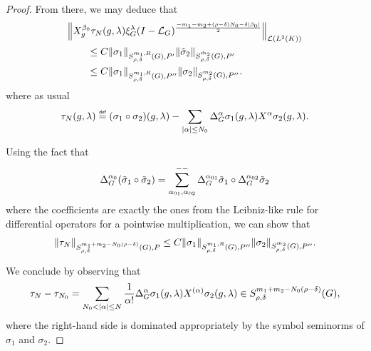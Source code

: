 \begin{proof}
    From there,
    we may deduce that
    \begin{align*}
        &\norm [\Lin {\Lebesgue 2 \CompactGroup}] {%
        \LeftDifferentialOperator [g] {\beta_0}
        \tau_N(g, \lambda)
        \Rep \lambda \BesselPotential {-m_1 - m_2 + (\rho - \delta) N_0 - \delta \abs {\beta_0}}
        }\\
        &\qquad \leq C \SymbolSemiNorm {m_1, R} {\rho, \delta} {P'} {\sigma_1} \SymbolSemiNorm {\tilde m_2} {\rho, \delta} {P'} {\tilde \sigma_2}\\
        &\qquad \leq C \SymbolSemiNorm {m_1, R} {\rho, \delta} {P''} {\sigma_1} \SymbolSemiNorm {m_2} {\rho, \delta} {P''} {\sigma_2}.
    \end{align*}
    where as usual
    \begin{align*}
        \tau_N(g, \lambda)
        \defeq
        (\sigma_1 \circ \sigma_2)(g, \lambda)
        - \sum_{\abs \alpha \leq N_0} \DifferenceOperatorOrder \alpha \sigma_1(g, \lambda) \LeftDifferentialOperator \alpha \sigma_2(g, \lambda).
    \end{align*}

    Using the fact that
    \begin{align*}
        \DifferenceOperatorOrder {\alpha_0} (\tilde \sigma_1 \circ \tilde \sigma_2)
        = \lcsum{\alpha_{01}, \alpha_{02}}
        \DifferenceOperatorOrder {\alpha_{01}} \tilde \sigma_1 \circ
        \DifferenceOperatorOrder {\alpha_{02}} \tilde \sigma_2
    \end{align*}
    where the coefficients are exactly the ones from the Leibniz-like rule for differential operators for a pointwise multiplication,
    we can show that
    \begin{align*}
        \SymbolSemiNorm {m_1 + m_2 - N_0 (\rho - \delta)} {\rho, \delta} P {\tau_N}
        \leq C \SymbolSemiNorm {m_1, R} {\rho, \delta} {P''} {\sigma_1} \SymbolSemiNorm {m_2} {\rho, \delta} {P''} {\sigma_2}.
    \end{align*}

    We conclude by observing that
    \begin{align*}
        \tau_N - \tau_{N_0}
        = \sum_{N_0 < \abs \alpha \leq N}
        \frac 1 {\alpha!}
        \DifferenceOperatorOrder \alpha \sigma_1(g, \lambda)
        \TaylorLeftDifferentialOperator \alpha \sigma_2(g, \lambda)
        \in \SymbolClass {m_1 + m_2 - N_0 (\rho - \delta)} {\rho, \delta},
    \end{align*}
    where the right-hand side is dominated appropriately by the symbol seminorms of $\sigma_1$ and $\sigma_2$.
\end{proof}

